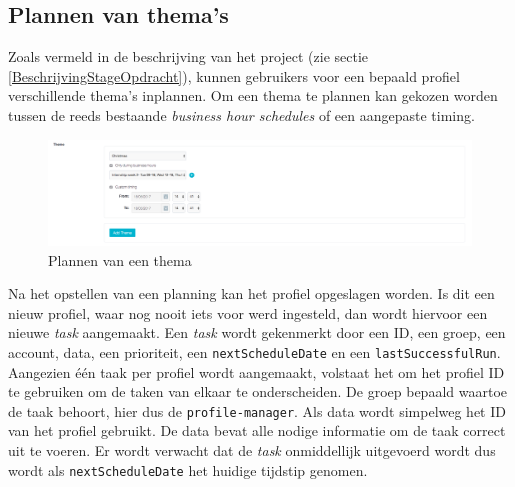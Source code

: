 

\subsection{Plannen van thema's}
Zoals vermeld in de beschrijving van het project (zie sectie \ref{BeschrijvingStageOpdracht}), kunnen gebruikers voor een bepaald profiel verschillende thema's inplannen. Om een thema te plannen kan gekozen worden tussen de reeds bestaande \textit{business hour schedules} of een aangepaste timing. 

\begin{figure}[H]
	\centering
	\includegraphics[width=1\textwidth]{Figuren/ThemeSet.png}
	\caption{Plannen van een thema}
	\label{fig:ThemeSet}
\end{figure}
Na het opstellen van een planning kan het profiel opgeslagen worden. Is dit een nieuw profiel, waar nog nooit iets voor werd ingesteld, dan wordt hiervoor een nieuwe \textit{task} aangemaakt. Een \textit{task} wordt gekenmerkt door een ID, een groep, een account, data, een prioriteit, een \texttt{nextScheduleDate} en een \texttt{lastSuccessfulRun}. Aangezien \'{e}\'{e}n taak per profiel wordt aangemaakt, volstaat het om het profiel ID te gebruiken om de taken van elkaar te onderscheiden. De groep bepaald waartoe de taak behoort, hier dus de \texttt{profile-manager}. Als data wordt simpelweg het ID van het profiel gebruikt. De data bevat alle nodige informatie om de taak correct uit te voeren. Er wordt verwacht dat de \textit{task} onmiddellijk uitgevoerd wordt dus wordt als \texttt{nextScheduleDate} het huidige tijdstip genomen. 

